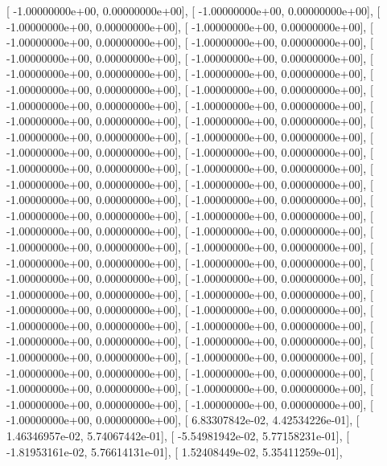 \documentclass{article}
\begin{document}
       [ -1.00000000e+00,   0.00000000e+00],
       [ -1.00000000e+00,   0.00000000e+00],
       [ -1.00000000e+00,   0.00000000e+00],
       [ -1.00000000e+00,   0.00000000e+00],
       [ -1.00000000e+00,   0.00000000e+00],
       [ -1.00000000e+00,   0.00000000e+00],
       [ -1.00000000e+00,   0.00000000e+00],
       [ -1.00000000e+00,   0.00000000e+00],
       [ -1.00000000e+00,   0.00000000e+00],
       [ -1.00000000e+00,   0.00000000e+00],
       [ -1.00000000e+00,   0.00000000e+00],
       [ -1.00000000e+00,   0.00000000e+00],
       [ -1.00000000e+00,   0.00000000e+00],
       [ -1.00000000e+00,   0.00000000e+00],
       [ -1.00000000e+00,   0.00000000e+00],
       [ -1.00000000e+00,   0.00000000e+00],
       [ -1.00000000e+00,   0.00000000e+00],
       [ -1.00000000e+00,   0.00000000e+00],
       [ -1.00000000e+00,   0.00000000e+00],
       [ -1.00000000e+00,   0.00000000e+00],
       [ -1.00000000e+00,   0.00000000e+00],
       [ -1.00000000e+00,   0.00000000e+00],
       [ -1.00000000e+00,   0.00000000e+00],
       [ -1.00000000e+00,   0.00000000e+00],
       [ -1.00000000e+00,   0.00000000e+00],
       [ -1.00000000e+00,   0.00000000e+00],
       [ -1.00000000e+00,   0.00000000e+00],
       [ -1.00000000e+00,   0.00000000e+00],
       [ -1.00000000e+00,   0.00000000e+00],
       [ -1.00000000e+00,   0.00000000e+00],
       [ -1.00000000e+00,   0.00000000e+00],
       [ -1.00000000e+00,   0.00000000e+00],
       [ -1.00000000e+00,   0.00000000e+00],
       [ -1.00000000e+00,   0.00000000e+00],
       [ -1.00000000e+00,   0.00000000e+00],
       [ -1.00000000e+00,   0.00000000e+00],
       [ -1.00000000e+00,   0.00000000e+00],
       [ -1.00000000e+00,   0.00000000e+00],
       [ -1.00000000e+00,   0.00000000e+00],
       [ -1.00000000e+00,   0.00000000e+00],
       [ -1.00000000e+00,   0.00000000e+00],
       [ -1.00000000e+00,   0.00000000e+00],
       [ -1.00000000e+00,   0.00000000e+00],
       [ -1.00000000e+00,   0.00000000e+00],
       [ -1.00000000e+00,   0.00000000e+00],
       [ -1.00000000e+00,   0.00000000e+00],
       [ -1.00000000e+00,   0.00000000e+00],
       [ -1.00000000e+00,   0.00000000e+00],
       [ -1.00000000e+00,   0.00000000e+00],
       [ -1.00000000e+00,   0.00000000e+00],
       [ -1.00000000e+00,   0.00000000e+00],
       [ -1.00000000e+00,   0.00000000e+00],
       [ -1.00000000e+00,   0.00000000e+00],
       [  6.83307842e-02,   4.42534226e-01],
       [  1.46346957e-02,   5.74067442e-01],
       [ -5.54981942e-02,   5.77158231e-01],
       [ -1.81953161e-02,   5.76614131e-01],
       [  1.52408449e-02,   5.35411259e-01],
\end{document}
